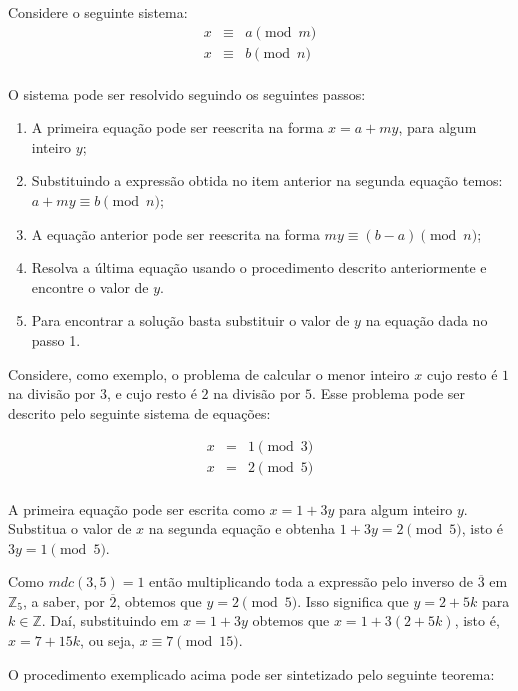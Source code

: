 Considere o seguinte sistema:
\[
\begin{array}{ccc}
	x & \equiv & a \pmod{m}\\
	x & \equiv & b \pmod{n}\\
\end{array}
\]

O sistema pode ser resolvido seguindo os seguintes passos:
\begin{enumerate}
	\item A primeira equa\c{c}\~{a}o pode ser reescrita na forma $x=a+my$, para algum inteiro $y$;
	\item Substituindo a express\~{a}o obtida no item anterior na segunda equa\c{c}\~{a}o temos: $a+my\equiv b \pmod{n}$;
	\item A equa\c{c}\~{a}o anterior pode ser reescrita na forma $my\equiv (b-a) \pmod{n}$;
	\item Resolva a \'{u}ltima equa\c{c}\~{a}o usando o procedimento descrito anteriormente e encontre o valor de $y$.
	\item Para encontrar a solu\c{c}\~{a}o basta substituir o valor de $y$ na equa\c{c}\~{a}o dada no passo 1. 
\end{enumerate}

Considere, como exemplo, o problema de calcular o menor inteiro $x$ cujo resto \'{e} $1$ na divis\~ao por $3$, 
e cujo resto \'{e} $2$ na divis\~ao por $5$. Esse problema pode ser descrito pelo seguinte sistema de equa\c{c}\~oes:

\[
\begin{array}{ccc}
x & = & 1\pmod{3} \\
x & = & 2 \pmod{5}\\
\end{array}
\]

A primeira equa\c{c}\~{a}o pode ser escrita como $x=1+3y$ para algum inteiro $y$. Substitua o valor de $x$ na segunda 
equa\c{c}\~{a}o e obtenha $1+3y=2\pmod{5}$, isto \'{e} $3y=1\pmod{5}$. 

Como $mdc(3,5)=1$ ent\~{a}o multiplicando toda a express\~{a}o pelo inverso de $\overline{3}$ em $\mathbb{Z}_{5}$, a saber, 
por $\overline{2}$, obtemos que $y=2\pmod{5}$. Isso significa que $y=2+5k$ para $k\in\mathbb{Z}$.  
Da\'{i}, substituindo em $x=1+3y$ obtemos que $x=1+3(2+5k)$, isto \'{e}, $x=7+15k$, ou seja, $x\equiv 7\pmod{15}$.  

O procedimento exemplicado acima pode ser sintetizado pelo seguinte teorema:

